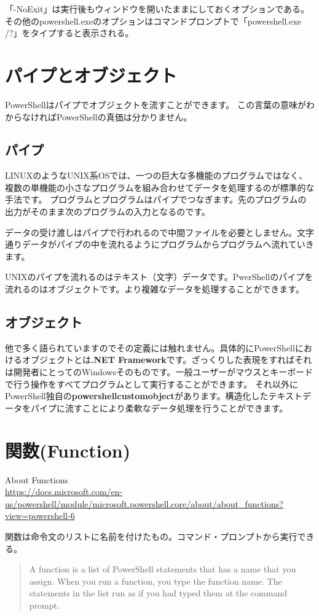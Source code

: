 \documentclass[dvipdfmx]{jsarticle}
\begin{document}
「-NoExit」は実行後もウィンドウを開いたままにしておくオプションである。その他のpowershell.exeのオプションはコマンドプロンプトで「powershell.exe /?」をタイプすると表示される。


\section{パイプとオブジェクト}
PowerShellはパイプでオブジェクトを流すことができます。
この言葉の意味がわからなければPowerShellの真価は分かりません。

\subsection{パイプ}
LINUXのようなUNIX系OSでは、一つの巨大な多機能のプログラムではなく、複数の単機能の小さなプログラムを組み合わせてデータを処理するのが標準的な手法です。
プログラムとプログラムはパイプでつなぎます。先のプログラムの出力がそのまま次のプログラムの入力となるのです。

データの受け渡しはパイプで行われるので中間ファイルを必要としません。文字通りデータがパイプの中を流れるようにプログラムからプログラムへ流れていきます。

UNIXのパイプを流れるのはテキスト（文字）データです。PwerShellのパイプを流れるのはオブジェクトです。より複雑なデータを処理することができます。


\subsection{オブジェクト}
他で多く語られていますのでその定義には触れません。具体的にPowerShellにおけるオブジェクトとは\textbf{.NET Framework}です。ざっくりした表現をすればそれは開発者にとってのWindowsそのものです。一般ユーザーがマウスとキーボードで行う操作をすべてプログラムとして実行することができます。
それ以外にPowerShell独自の\textbf{powershellcustomobject}があります。構造化したテキストデータをパイプに流すことにより柔軟なデータ処理を行うことができます。


\section{関数(Function)}

About Functions \\
\url{https://docs.microsoft.com/en-us/powershell/module/microsoft.powershell.core/about/about_functions?view=powershell-6}

関数は命令文のリストに名前を付けたもの。コマンド・プロンプトから実行できる。
\begin{quote}
A function is a list of PowerShell statements that has a name that you assign. When you run a function, you type the function name. The statements in the list run as if you had typed them at the command prompt.
\end{quote}
\end{document}
